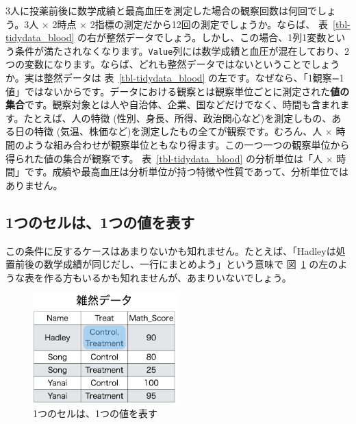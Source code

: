 \documentclass[
  a4paper,
  pandoc,
  ja=standard,
  jafont=haranoaji]{bxjsbook}
\begin{document}
3人に投薬前後に数学成績と最高血圧を測定した場合の観察回数は何回でしょう。3人
\(\times\) 2時点 \(\times\)
2指標の測定だから12回の測定でしょうか。ならば、
表~\ref{tbl-tidydata_blood}
の右が整然データでしょう。しかし、この場合、1列1変数という条件が満たされなくなります。\texttt{Value}列には数学成績と血圧が混在しており、2つの変数になります。ならば、どれも整然データではないということでしょうか。実は整然データは
表~\ref{tbl-tidydata_blood}
の左です。なぜなら、「1観察=1値」ではないからです。データにおける観察とは観察単位ごとに測定された\textbf{値の集合}です。観察対象とは人や自治体、企業、国などだけでなく、時間も含まれます。たとえば、人の特徴
(性別、身長、所得、政治関心など)を測定しもの、ある日の特徴
(気温、株価など)を測定したもの全てが観察です。むろん、人 \(\times\)
時間のような組み合わせが観察単位ともなり得ます。この一つ一つの観察単位から得られた値の集合が観察です。
表~\ref{tbl-tidydata_blood} の分析単位は「人 \(\times\)
時間」です。成績や最高血圧は分析単位が持つ特徴や性質であって、分析単位ではありません。

\hypertarget{ux3064ux306eux30bbux30ebux306f1ux3064ux306eux5024ux3092ux8868ux3059}{%
\subsection{1つのセルは、1つの値を表す}\label{ux3064ux306eux30bbux30ebux306f1ux3064ux306eux5024ux3092ux8868ux3059}}

この条件に反するケースはあまりないかも知れません。たとえば、「Hadleyは処置前後の数学成績が同じだし、一行にまとめよう」という意味で
図~\ref{fig-tidydata_example3}
の左のような表を作る方もいるかも知れませんが、あまりいないでしょう。

\begin{figure}

{\centering \includegraphics[width=0.5\textwidth,height=\textheight]{./Figs/Tidydata/TidyData3.png}

}

\caption{\label{fig-tidydata_example3}1つのセルは、1つの値を表す}

\end{figure}
\end{document}
